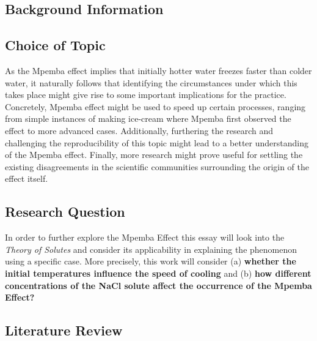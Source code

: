 \documentclass[../main.tex]{subfiles}
\begin{document}
\doublespacing

\subsection{Background Information}


\subsection{Choice of Topic}
As the Mpemba effect implies that initially hotter water freezes faster than colder water, it naturally follows that identifying the circumstances under which this takes place might give rise to some important implications for the practice. Concretely, Mpemba effect might be used to speed up certain processes, ranging from simple instances of making ice-cream where Mpemba first observed the effect to more advanced cases. Additionally, furthering the research and challenging the reproducibility of this topic might lead to a better understanding of the Mpemba effect. Finally, more research might prove useful for settling the existing disagreements in the scientific communities surrounding the origin of the effect itself. 

\subsection{Research Question}
In order to further explore the Mpemba Effect this essay will look into the \emph{Theory of Solutes} and consider its applicability in explaining the phenomenon using a specific case. More precisely, this work will consider (a) \textbf{whether the initial temperatures influence the speed of cooling} and (b) \textbf{how different concentrations of the NaCl solute affect the occurrence of the Mpemba Effect?} \par

\subsection{Literature Review}

\end{document}
